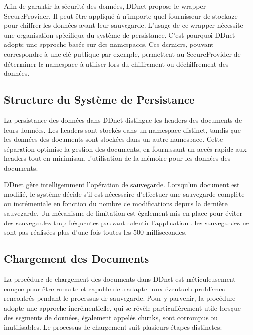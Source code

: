 Afin de garantir la sécurité des données, \Gls{DDnet} propose le wrapper SecureProvider. Il peut être appliqué à n'importe quel fournisseur de stockage pour chiffrer les données avant leur sauvegarde. L'usage de ce wrapper nécessite une organisation spécifique du système de persistance. C'est pourquoi \Gls{DDnet} adopte une approche basée sur des namespaces. Ces derniers, pouvant correspondre à une clé publique par exemple, permettent au SecureProvider de déterminer le namespace à utiliser lors du chiffrement ou déchiffrement des données.

\subsection{Structure du Système de Persistance}

La persistance des données dans \Gls{DDnet} distingue les headers des documents de leurs données. Les headers sont stockés dans un namespace distinct, tandis que les données des documents sont stockées dans un autre namespace. Cette séparation optimise la gestion des documents, en fournissant un accès rapide aux headers tout en minimisant l'utilisation de la mémoire pour les données des documents.

\Gls{DDnet} gère intelligemment l'opération de sauvegarde. Lorsqu'un document est modifié, le système décide s'il est nécessaire d'effectuer une sauvegarde complète ou incrémentale en fonction du nombre de modifications depuis la dernière sauvegarde. Un mécanisme de limitation est également mis en place pour éviter des sauvegardes trop fréquentes pouvant ralentir l'application : les sauvegardes ne sont pas réalisées plus d'une fois toutes les 500 millisecondes.

\subsection{Chargement des Documents}

La procédure de chargement des documents dans \Gls{DDnet} est méticuleusement conçue pour être robuste et capable de s'adapter aux éventuels problèmes rencontrés pendant le processus de sauvegarde. Pour y parvenir, la procédure adopte une approche incrémentielle, qui se révèle particulièrement utile lorsque des segments de données, également appelés \guillemotleft chunks\guillemotright, sont corrompus ou inutilisables. Le processus de chargement suit plusieurs étapes distinctes:

